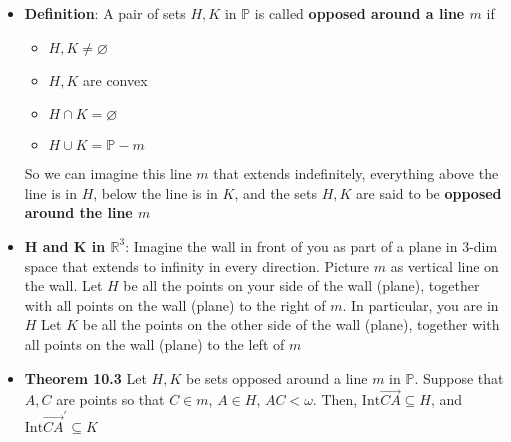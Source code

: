 \documentclass{report}
\begin{document}
\begin{itemize}
        \item \textbf{Definition}: A pair of sets $H,K$ in $\mathbb{P}$ is called \textbf{opposed around a line $m$} if 
            \begin{itemize}
                \item $H,K \ne \varnothing $
                \item $H,K$ are convex
                \item $H \cap K = \varnothing $
                \item $H \cup K = \mathbb{P} - m$
            \end{itemize}
            \bigbreak \noindent 
            \begin{figure}[ht]
                \centering
                \label{fig:opposed}
            \end{figure}
            \bigbreak \noindent 
            So we can imagine this line $m$ that extends indefinitely, everything above the line is in $H$, below the line is in $K$, and the sets $H,K$ are said to be \textbf{opposed around the line $m$}
            \bigbreak \noindent 
            \begin{figure}[ht]
                \centering
                \label{fig:ing}
            \end{figure}
            \bigbreak \noindent 
            \begin{figure}[ht]
                \centering
                \label{fig:insh}
            \end{figure}
        \item \textbf{H and K in $\mathbb{R}^{3}$}: Imagine the wall in front of you as part of a plane in $3$-dim space that extends to infinity in every direction.
            \bigbreak \noindent 
            Picture $m$ as vertical line on the wall. Let $H$ be all the points on your side of the wall (plane), together with all points on the wall (plane) to the right of $m$. In particular, you are in $H$
            \bigbreak \noindent 
            Let $K$ be all the points on the other side of the wall (plane), together with all points on the wall (plane) to the left of $m$
        \item \textbf{Theorem 10.3} Let $H,K$ be sets opposed around a line $m$ in $\mathbb{P}$. Suppose that $A,C$ are points so that $C \in m$, $A \in H$, $AC < \omega$. Then, $\text{Int}\overrightarrow{CA} \subseteq H$, and $\text{Int}\overrightarrow{CA}^{\prime} \subseteq K $

\end{itemize}
\end{document}
